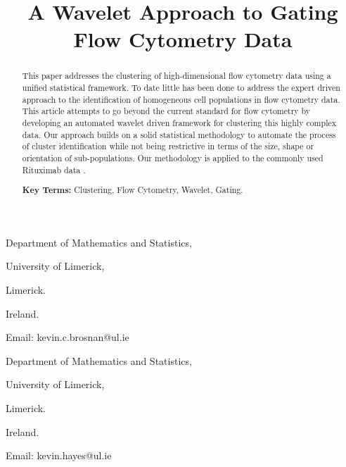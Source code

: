 \documentclass[a4paper, 12pt]{article}
\title{\bf A Wavelet Approach to Gating Flow Cytometry Data}
\author{}
\begin{document}

\maketitle

\newpage
{}

\begin{abstract}
\noindent
This paper addresses the clustering of high-dimensional flow cytometry data using a unified statistical framework. To date little has been done to address the expert driven approach to the identification of homogeneous cell populations in flow cytometry data. This article attempts to go beyond the current standard for flow cytometry by developing an automated wavelet driven framework for clustering this highly complex data. Our approach builds on a solid statistical methodology to automate the process of cluster identification while not being restrictive in terms of the size, shape or orientation of sub-populations. Our methodology is applied to
the commonly used Rituximab data \citep{rit}.

\medskip
\noindent
{\bf Key Terms:} Clustering, Flow Cytometry, Wavelet, Gating.
\end{abstract}

\newpage
{}
\par \par {}
\par \par \noindent Department of Mathematics and Statistics,
\par \par \noindent University of Limerick,
\par \par \noindent Limerick.
\par \par \noindent Ireland.
\par \par \noindent Email: kevin.c.brosnan@ul.ie

\medskip \medskip
\par \par {}
\par \par \noindent Department of Mathematics and Statistics,
\par \par \noindent University of Limerick,
\par \par \noindent Limerick.
\par \par \noindent Ireland.
\par \par \noindent Email: kevin.hayes@ul.ie
\end{document}
